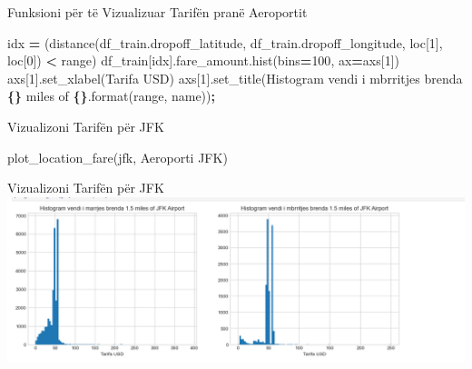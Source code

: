 \documentclass[
  ignorenonframetext,
]{beamer}
\newenvironment{Shaded}{\begin{snugshade}}{\end{snugshade}}
\newcommand{\BuiltInTok}[1]{#1}
\newcommand{\DecValTok}[1]{\textcolor[rgb]{0.00,0.00,0.81}{#1}}
\newcommand{\NormalTok}[1]{#1}
\newcommand{\OperatorTok}[1]{\textcolor[rgb]{0.81,0.36,0.00}{\textbf{#1}}}
\newcommand{\SpecialCharTok}[1]{\textcolor[rgb]{0.81,0.36,0.00}{\textbf{#1}}}
\newcommand{\StringTok}[1]{\textcolor[rgb]{0.31,0.60,0.02}{#1}}
\begin{document}
\begin{frame}[fragile]{Funksioni për të Vizualizuar Tarifën pranë
Aeroportit}
\begin{Shaded}
\begin{Highlighting}[]
\NormalTok{    idx }\OperatorTok{=}\NormalTok{ (distance(df\_train.dropoff\_latitude, df\_train.dropoff\_longitude, loc[}\DecValTok{1}\NormalTok{], loc[}\DecValTok{0}\NormalTok{]) }\OperatorTok{\textless{}} \BuiltInTok{range}\NormalTok{)}
\NormalTok{    df\_train[idx].fare\_amount.hist(bins}\OperatorTok{=}\DecValTok{100}\NormalTok{, ax}\OperatorTok{=}\NormalTok{axs[}\DecValTok{1}\NormalTok{])}
\NormalTok{    axs[}\DecValTok{1}\NormalTok{].set\_xlabel(}\StringTok{\textquotesingle{}Tarifa USD\textquotesingle{}}\NormalTok{)}
\NormalTok{    axs[}\DecValTok{1}\NormalTok{].set\_title(}\StringTok{\textquotesingle{}Histogram vendi i mbrritjes brenda }\SpecialCharTok{\{\}}\StringTok{ miles of }\SpecialCharTok{\{\}}\StringTok{\textquotesingle{}}\NormalTok{.}\BuiltInTok{format}\NormalTok{(}\BuiltInTok{range}\NormalTok{, name))}\OperatorTok{;}
\end{Highlighting}
\end{Shaded}
\end{frame}

\begin{frame}[fragile]{Vizualizoni Tarifën për JFK}
\protect\hypertarget{vizualizoni-tarifuxebn-puxebr-jfk}{}

\begin{Shaded}
\begin{Highlighting}[]
\NormalTok{plot\_location\_fare(jfk, }\StringTok{\textquotesingle{}Aeroporti JFK\textquotesingle{}}\NormalTok{)}
\end{Highlighting}
\end{Shaded}
\end{frame}

\begin{frame}{Vizualizoni Tarifën për JFK}
\protect\hypertarget{vizualizoni-tarifuxebn-puxebr-jfk-1}{}
\includegraphics{./Figs/train26.png}
\end{frame}
\end{document}
